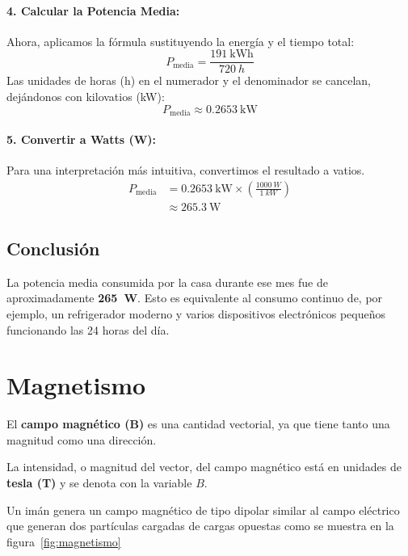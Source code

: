 \documentclass[11pt,a4paper]{book}
\begin{document}
\paragraph{4. Calcular la Potencia Media:}
Ahora, aplicamos la fórmula sustituyendo la energía y el tiempo total:
\[ P_{\text{media}} = \frac{\qty{191}{\kilo\watt\hour}}{\qty{720}{h}} \]
Las unidades de horas (h) en el numerador y el denominador se cancelan, dejándonos con kilovatios (kW):
\[ P_{\text{media}} \approx \qty{0.2653}{\kilo\watt} \]

\paragraph{5. Convertir a Watts (W):}
Para una interpretación más intuitiva, convertimos el resultado a vatios.
\begin{align*}
    P_{\text{media}} &= \qty{0.2653}{\kilo\watt} \times \left( \frac{\qty{1000}{W}}{\qty{1}{kW}} \right) \\
                     &\approx \qty{265.3}{\watt}
\end{align*}

\subsection*{Conclusión}
La potencia media consumida por la casa durante ese mes fue de aproximadamente \textbf{\qty{265}{\watt}}. Esto es equivalente al consumo continuo de, por ejemplo, un refrigerador moderno y varios dispositivos electrónicos pequeños funcionando las 24 horas del día.



\section{Magnetismo}


El \textbf{campo magnético ($\boldsymbol{B}$)} es una cantidad vectorial, ya que tiene tanto una magnitud como una dirección.

La intensidad, o magnitud del vector, del campo magnético está en unidades de \textbf{tesla (T)} y se denota con la variable $B$.

Un imán genera un campo magnético de tipo dipolar similar al campo eléctrico que generan dos partículas cargadas de cargas opuestas como se muestra en la figura~\ref{fig:magnetismo}
\end{document}
